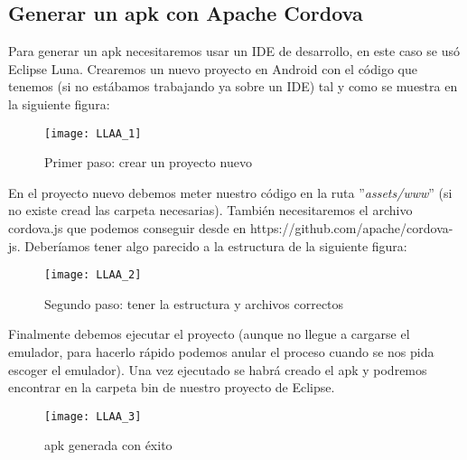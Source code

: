 \subsection*{Generar un apk con Apache Cordova}

Para generar un apk necesitaremos usar un IDE de desarrollo, en este caso se usó Eclipse Luna. Crearemos un nuevo proyecto en Android con el código que tenemos (si no estábamos trabajando ya sobre un IDE) tal y como se muestra en la siguiente figura:\\

\begin{figure}[H]
	\centering
	\texttt{[image: LLAA\_1]}
	\caption{Primer paso: crear un proyecto nuevo}
	\label{fig:LLAA-1}
\end{figure}

En el proyecto nuevo debemos meter nuestro código en la ruta ''\textit{assets/www}'' (si no existe cread las carpeta necesarias). También necesitaremos el archivo cordova.js que podemos conseguir desde en https://github.com/apache/cordova-js. Deberíamos tener algo parecido a la estructura de la siguiente figura:\\

\begin{figure}[H]
	\centering
	\texttt{[image: LLAA\_2]}
	\caption{Segundo paso: tener la estructura y archivos correctos}
	\label{fig:LLAA-2}
\end{figure}

Finalmente debemos ejecutar el proyecto (aunque no llegue a cargarse el emulador, para hacerlo rápido podemos anular el proceso cuando se nos pida escoger el emulador). Una vez ejecutado se habrá creado el apk y podremos encontrar en la carpeta bin de nuestro proyecto de Eclipse.\\

\begin{figure}[H]
	\centering
	\texttt{[image: LLAA\_3]}
	\caption{apk generada con éxito}
	\label{fig:LLAA-3}
\end{figure}